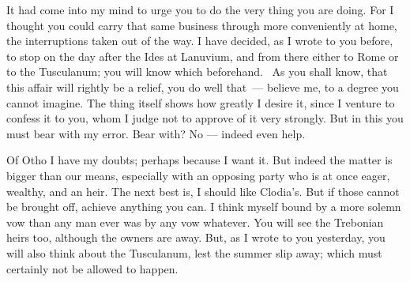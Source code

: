 

 It had come into my mind to urge you to do the very thing you are doing. For I thought you could carry that same business through more conveniently at home, the interruptions taken out of the way. I have decided, as I wrote to you before, to stop on the day after the Ides at Lanuvium, and from there either to Rome or to the Tusculanum; you will know which beforehand. \dag\ As you shall know, that this affair will rightly be a relief, you do well that\dag\ --- believe me, to a degree you cannot imagine. The thing itself shows how greatly I desire it, since I venture to confess it to you, whom I judge not to approve of it very strongly. But in this you must bear with my error. Bear with? No --- indeed even help.

 Of Otho I have my doubts; perhaps because I want it. But indeed the matter is bigger than our means, especially with an opposing party who is at once eager, wealthy, and an heir. The next best is, I should like Clodia's. But if those cannot be brought off, achieve anything you can. I think myself bound by a more solemn vow than any man ever was by any vow whatever. You will see the Trebonian heirs too, although the owners are away. But, as I wrote to you yesterday, you will also think about the Tusculanum, lest the summer slip away; which must certainly not be allowed to happen.
